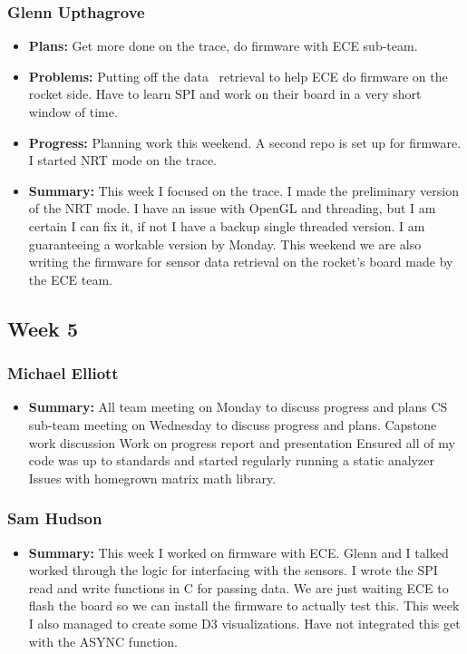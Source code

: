 \documentclass[onecolumn, draftclsnofoot,10pt, compsoc]{IEEEtran}
\begin{document}
\subsubsection{Glenn Upthagrove}
\begin {itemize}
 \item \textbf{Plans: }Get more done on the trace, do firmware with ECE sub-team.
 \item \textbf{Problems: }Putting off the data  retrieval to help ECE do firmware on the rocket side. Have to learn SPI and work on their board in a very short window of time. 
 \item \textbf{Progress: }Planning work this weekend. A second repo is set up for firmware. I started NRT mode on the trace. 
 \item \textbf{Summary: }This week I focused on the trace. I made the preliminary version of the NRT mode. I have an issue with OpenGL and threading, but I am certain I can fix it, if not I have a backup single threaded version. I am guaranteeing a workable version by Monday. This weekend we are also writing the firmware for sensor data retrieval on the rocket's board made by the ECE team.  
\end {itemize}
\subsection {Week 5}
\subsubsection{Michael Elliott}
\begin {itemize}
\item \textbf{Summary: }
All team meeting on Monday to discuss progress and plans
CS sub-team meeting on Wednesday to discuss progress and plans.
Capstone work discussion
Work on progress report and presentation
Ensured all of my code was up to standards and started regularly
running a static analyzer
Issues with homegrown matrix math library.
\end {itemize}
\subsubsection{Sam Hudson}
\begin {itemize}
\item \textbf{Summary: }This week I worked on firmware with ECE. Glenn and I talked worked through the logic for interfacing with the sensors. I wrote the SPI read and write functions in C for passing data. We are just waiting ECE to flash the board so we can install the firmware to actually test this. This week I also managed to create some D3 visualizations. Have not integrated this get with the ASYNC function.
\end {itemize}
\end{document}
